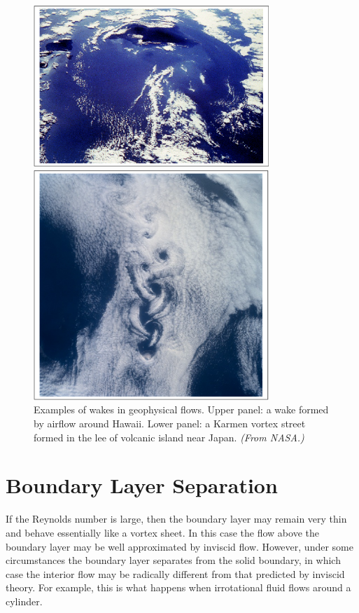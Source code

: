 \documentclass[10pt]{report}
\begin{document}
\begin{figure}[htbp]
\centerline{\includegraphics[width=3.5in]{Hawaii.jpg}}
\bigskip
\centerline{\includegraphics[width=3.5in]{island.jpg}}
\caption{Examples of wakes in geophysical flows. Upper panel: a wake formed by airflow around Hawaii. Lower panel: a Karmen vortex street formed in the lee of volcanic island near Japan. {\em (From NASA.)} }
\label{fig5.5}
\end{figure}

\section{Boundary Layer Separation}
If the Reynolds number is large, then the boundary layer may remain very
thin and behave essentially like a vortex sheet. In this case the flow above
the boundary layer may be well approximated by inviscid flow. However, under
some circumstances the boundary layer separates from the solid boundary, in
which case the interior flow may be radically different from that predicted
by inviscid theory. For example, this is what happens when irrotational
fluid flows around a cylinder.
\end{document}
